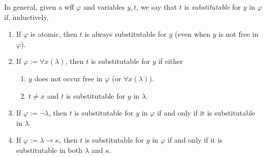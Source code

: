 \documentclass{treatise}
\begin{document}
In general, given a wff $\varphi$ and variables $y, t$, we say that $t$ is \emph{substitutable} for $y$ in $\varphi$ if, inductively,
\begin{enumerate}
    \item If $\varphi$ is atomic, then $t$ is always substitutable for $y$ (even when $y$ is not free in $\varphi$).
    \item If $\varphi := \forall x (\lambda)$, then $t$ is substitutable for $y$ if either
    \begin{enumerate}
        \item $y$ does not occur free in $\varphi$ (or $\forall x (\lambda)$).
        \item $t \neq x$ and $t$ is substitutable for $y$ in $\lambda$.
    \end{enumerate}
    \item If $\varphi := \neg \lambda$, then $t$ is substitutable for $y$ in $\varphi$ if and only if it is substitutable in $\lambda$.
    \item If $\varphi := \lambda \to \kappa$, then $t$ is substitutable for $y$ in $\varphi$ if and only if it is substitutable in both $\lambda$ and $\kappa$.
\end{enumerate}
\end{document}
